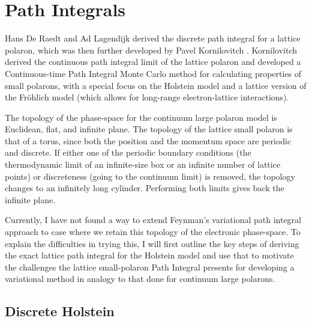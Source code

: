\chapter{Path Integrals}

Hans De Raedt and Ad Lagendijk \cite{Raedt1983, Raedt1985} derived the discrete path integral for a lattice polaron, which was then further developed by Pavel Kornilovitch \cite{kornilovitch_polaron_1997, kornilovitch_continuous-time_1998, kornilovitch_ground-state_1999, kornilovitch_giant_1999, kornilovitch_band_2000, kornilovitch_mass_2004, kornilovitch_path_2007}. Kornilovitch derived the continuous path integral limit of the lattice polaron and developed a Continuous-time Path Integral Monte Carlo method for calculating properties of small polarons, with a special focus on the Holstein model and a lattice version of the Fr\"ohlich model (which allows for long-range electron-lattice interactions).
\newline 

The topology of the phase-space for the continuum large polaron model is Euclidean, flat, and infinite plane. The topology of the lattice small polaron is that of a torus, since both the position and the momentum space are periodic and discrete. If either one of the periodic boundary conditions (the thermodynamic limit of an infinite-size box or an infinite number of lattice points) or discreteness (going to the continuum limit) is removed, the topology changes to an infinitely long cylinder. Performing both limits gives back the infinite plane.
\newline 

Currently, I have not found a way to extend Feynman's variational path integral approach to case where we retain this topology of the electronic phase-space. To explain the difficulties in trying this, I will first outline the key steps of deriving the exact lattice path integral for the Holstein model and use that to motivate the challenges the lattice small-polaron Path Integral presents for developing a variational method in analogy to that done for continuum large polarons.

\section{Discrete Holstein}

